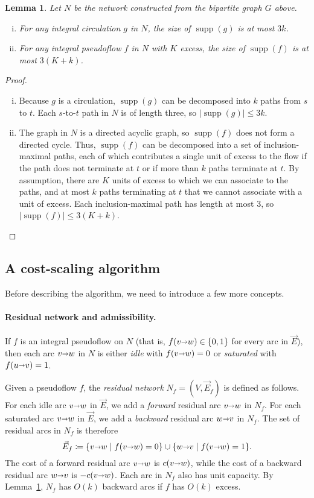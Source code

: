 \documentclass[11pt]{article}
\makeatletter
\def\abs#1{\mathopen| #1 \mathclose|}		%
\def\arcto{\mathord\shortrightarrow}
\def\arc#1#2{#1\arcto#2}
\def\supp{\operatorname{supp}}
\newtheorem{lemma}{Lemma}[section]
\numberwithin{figure}{section}
\def\EMPH#1{\textcolor{BrickRed}{{\emph{#1}}}}
\def\n@te#1{\textsf{\boldmath \textbf{$\langle\!\langle$#1$\rangle\!\rangle$}}\leavevmode}
\def\note#1{\textcolor{red}{\n@te{#1}}}
\makeatother
\begin{document}
\begin{lemma}
\label{lemma:supp_size}
Let $N$ be the network constructed from the bipartite graph $G$ above.
\begin{enumerate}[(i)]
\item For any integral circulation $g$ in $N$, the size of $\supp(g)$ is at most $3k$.
\item For any integral pseudoflow $f$ in $N$ with $K$ excess,
	the size of $\supp(f)$ is at most $3(K + k)$.
\end{enumerate}
\end{lemma}
\begin{proof}
\begin{enumerate}[(i)]
\item Because $g$ is a circulation, $\supp(g)$ can be decomposed into $k$  paths from $s$ to $t$.
	Each $s$-to-$t$ path in $N$ is of length three, so $\abs{\supp(g)} \leq 3k$.
\item The graph in $N$ is a directed acyclic graph, so $\supp(f)$ does not form a directed cycle.
	Thus, $\supp(f)$ can be decomposed into a set of inclusion-maximal paths,
	each of which contributes a single unit of excess to the flow if the path
	does not terminate at $t$ or if more than $k$ paths terminate at $t$.
	By assumption, there are $K$ units of excess to which we can associate to the paths,
	and at most $k$ paths terminating at $t$ that we cannot associate with a unit of excess.
	Each inclusion-maximal path has length at most 3, so $\abs{\supp(f)} \leq 3(K + k)$.
\end{enumerate}
\end{proof}

\subsection{A cost-scaling algorithm}
\label{SS:cost-scale}

Before describing the algorithm, we need to introduce a few more concepts.

\paragraph*{Residual network and admissibility.}
If $f$ is an integral pseudoflow on $N$
(that is, $f(\arc{v}{w}) \in \{0, 1\}$ for every arc in $\vec{E}$), then each arc
$\arc{v}{w}$ in $N$ is either \EMPH{idle} with $f(\arc{v}{w}) = 0$ or
\EMPH{saturated} with $f(\arc{u}{v}) = 1$.

Given a pseudoflow $f$, the \EMPH{residual network} $N_f = (V, \vec{E}_f)$ is
defined as follows.
For each idle arc $\arc{v}{w}$ in $\vec{E}$, we add a \EMPH{forward} residual
arc $\arc{v}{w}$ in $N_f$.
For each saturated arc $\arc{v}{w}$ in $\vec{E}$, we add a \EMPH{backward}
residual arc $\arc{w}{v}$ in $N_f$.
The set of residual arcs in $N_f$ is therefore
\[
\vec{E}_f \coloneqq \{\arc{v}{w} \mid f(\arc{v}{w}) = 0\} \cup \{\arc{w}{v} \mid f(\arc{v}{w}) = 1\}.
\]
The cost of a forward residual arc $\arc{v}{w}$ is $c(\arc{v}{w})$,
while the cost of a backward residual arc $\arc{w}{v}$ is $-c(\arc{v}{w})$.
Each arc in $N_f$ also has unit capacity.
By Lemma~\ref{lemma:supp_size}, $N_f$ has $O(k)$ backward arcs if $f$ has $O(k)$ excess.
\end{document}
